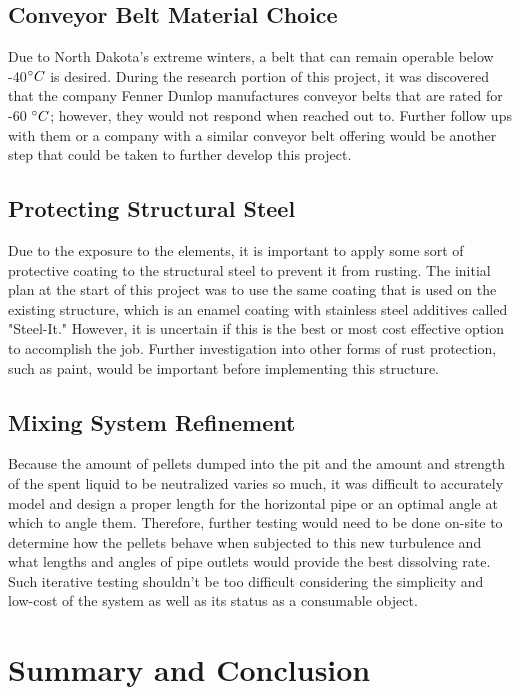 \documentclass[10pt]{project}
\begin{document}
\subsection{Conveyor Belt Material Choice}
Due to North Dakota's extreme winters, a belt that can remain operable below -40$\degree C$ is desired.  During the research portion of this project, it was discovered that the company Fenner Dunlop manufactures conveyor belts that are rated for -60 $\degree C$; however, they would not respond when reached out to.  Further follow ups with them or a company with a similar conveyor belt offering would be another step that could be taken to further develop this project.
\subsection{Protecting Structural Steel}
Due to the exposure to the elements, it is important to apply some sort of protective coating to the structural steel to prevent it from rusting.  The initial plan at the start of this project was to use the same coating that is used on the existing structure, which is an enamel coating with stainless steel additives called "Steel-It."\cite{steel-it}  However, it is uncertain if this is the best or most cost effective option to accomplish the job.  Further investigation into other forms of rust protection, such as paint, would be important before implementing this structure.
\subsection{Mixing System Refinement}
\label{sec:MixingSystemRefinement}
Because the amount of pellets dumped into the pit and the amount and strength of the spent liquid to be neutralized varies so much, it was difficult to accurately model and design a proper length for the horizontal pipe or an optimal angle at which to angle them.  Therefore, further testing would need to be done on-site to determine how the pellets behave when subjected to this new turbulence and what lengths and angles of pipe outlets would provide the best dissolving rate.  Such iterative testing shouldn't be too difficult considering the simplicity and low-cost of the system as well as its status as a consumable object. 



\section{Summary and Conclusion}
\end{document}
